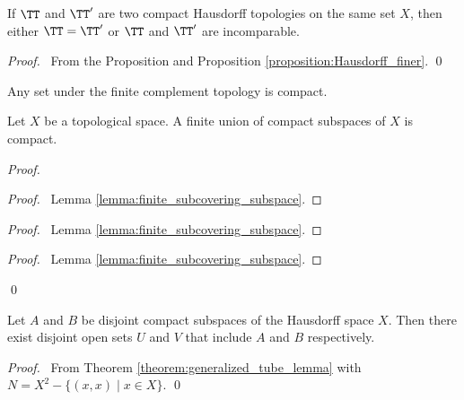 \begin{corollary}
    \label{corollary:compact_hausdorff_incomparable}
    If $\TT$ and $\TT'$ are two compact Hausdorff topologies on the same set $X$, then either $\TT = \TT'$ or $\TT$ and $\TT'$ are incomparable.
\end{corollary}

\begin{proof}
    \pf\ From the Proposition and Proposition \ref{proposition:Hausdorff_finer}. \qed
\end{proof}

\begin{example}
    Any set under the finite complement topology is compact.
\end{example}

\begin{proposition}
    \label{proposition:finite_union_compact}
    Let $X$ be a topological space. A finite union of compact subspaces of $X$ is compact.
\end{proposition}

\begin{proof}
    \pf
    \begin{proof}
        \pf\ Lemma \ref{lemma:finite_subcovering_subspace}.
    \end{proof}
    \begin{proof}
        \pf\ Lemma \ref{lemma:finite_subcovering_subspace}.
    \end{proof}
    \qedstep
    \begin{proof}
        \pf\ Lemma \ref{lemma:finite_subcovering_subspace}.
    \end{proof}
    \qed
\end{proof}

\begin{proposition}
    \label{proposition:disjoint_neighbourhoods_compact_Hausdorff}
    Let $A$ and $B$ be disjoint compact subspaces of the Hausdorff space $X$.
    Then there exist disjoint open sets $U$ and $V$ that include $A$ and $B$
    respectively.
\end{proposition}

\begin{proof}
    \pf\ From Theorem \ref{theorem:generalized_tube_lemma} with $N = X^2 - \{ (x,x) \mid x \in X \}$. \qed
\end{proof}

